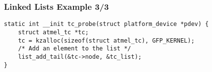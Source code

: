 \begin{frame}[fragile]
  \frametitle{Linked Lists Example 3/3}
\begin{verbatim}
static int __init tc_probe(struct platform_device *pdev) {
    struct atmel_tc *tc;
    tc = kzalloc(sizeof(struct atmel_tc), GFP_KERNEL);
    /* Add an element to the list */
    list_add_tail(&tc->node, &tc_list);
}
\end{verbatim}
\end{frame}
